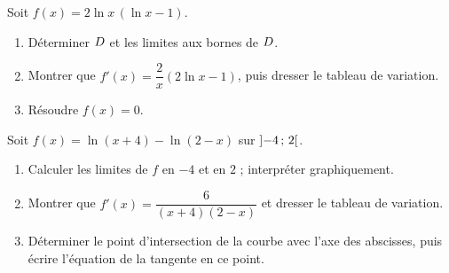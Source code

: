 \begin{annales}
Soit $f(x) = 2\ln x\,(\ln x-1)$.
\begin{enumerate}[label=\textbf{\alph*)}, leftmargin=*, itemsep=0.15em]
  \item Déterminer $D$ et les limites aux bornes de $D$.
  \item Montrer que $f'(x) = \dfrac{2}{x}\left(2\ln x-1\right)$, puis
        dresser le tableau de variation.
  \item Résoudre $f(x) = 0$.
\end{enumerate}

Soit $f(x) = \ln(x+4)-\ln(2-x)$ sur $\left]-4\,;\,2\right[$.
\begin{enumerate}[label=\textbf{\alph*)}, leftmargin=*, itemsep=0.15em]
  \item Calculer les limites de $f$ en $-4$ et en $2$ ; interpréter
        graphiquement.
  \item Montrer que $f'(x) = \dfrac{6}{(x+4)(2-x)}$ et dresser le tableau de
        variation.
  \item Déterminer le point d'intersection de la courbe avec l'axe des
        abscisses, puis écrire l'équation de la tangente en ce point.
\end{enumerate}
\end{annales}


